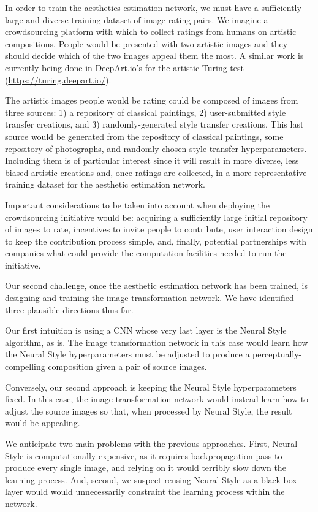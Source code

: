 In order to train the aesthetics estimation network, we must have a sufficiently large and diverse training dataset of image-rating pairs.
We imagine a crowdsourcing platform with which to collect ratings from humans on artistic compositions.
People would be presented with two artistic images and they should decide which of the two images appeal them the most.
A similar work is currently being done in DeepArt.io's for the artistic Turing test (\url{https://turing.deepart.io/}).

The artistic images people would be rating could be composed of images from three sources: 1) a repository of classical paintings, 2) user-submitted style transfer creations, and 3) randomly-generated style transfer creations.
This last source would be generated from the repository of classical paintings, some repository of photographs, and randomly chosen style transfer hyperparameters.
Including them is of particular interest since it will result in more diverse, less biased artistic creations and, once ratings are collected, in a more representative training dataset for the aesthetic estimation network.

Important considerations to be taken into account when deploying the crowdsourcing initiative would be: acquiring a sufficiently large initial repository of images to rate, incentives to invite people to contribute, user interaction design to keep the contribution process simple, and, finally, potential partnerships with companies what could provide the computation facilities needed to run the initiative.

Our second challenge, once the aesthetic estimation network has been trained, is designing and training the image transformation network.
We have identified three plausible directions thus far.

Our first intuition is using a CNN whose very last layer is the Neural Style algorithm, as is.
The image transformation network in this case would learn how the Neural Style hyperparameters must be adjusted to produce a perceptually-compelling composition given a pair of source images.

Conversely, our second approach is keeping the Neural Style hyperparameters fixed.
In this case, the image transformation network would instead learn how to adjust the source images so that, when processed by Neural Style, the result would be appealing.

We anticipate two main problems with the previous approaches.
First, Neural Style is computationally expensive, as it requires backpropagation pass to produce every single image, and relying on it would terribly slow down the learning process.
And, second, we suspect reusing Neural Style as a black box layer would would unnecessarily constraint the learning process within the network.

